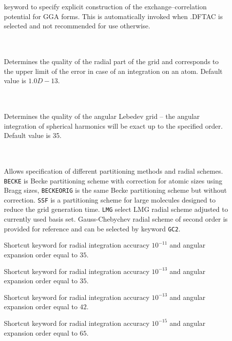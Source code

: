 \begin{description}
\item[]
  keyword to specify explicit construction of the exchange--correlation 
  potential for GGA forms. This is automatically invoked when .DFTAC is selected 
  and not recommended for use otherwise.

\item[] \ \\
   \\
  Determines the quality of the radial part of the grid and
  corresponds to the upper limit of the error in case of an
  integration on an atom. Default value is $1.0D-13$.

\item[] \ \\
   \\
  Determines the quality of the angular Lebedev grid -- the angular
  integration of spherical harmonics will be exact up to the specified
  order. Default value is 35.
\item[] \ \\
   \\
  Allows specification of different partitioning methods and radial
  schemes. \verb|BECKE| is Becke partitioning scheme with correction
  for atomic sizes using Bragg sizes, \verb|BECKEORIG| is the same
  Becke partitioning scheme but without correction. \verb|SSF| is a
  partitioning scheme for large molecules designed to reduce the grid
  generation time. \verb|LMG| select LMG radial scheme adjusted to
  currently used basis set. Gauss-Chebychev radial scheme of second
  order is provided for reference and can be selected by keyword
  \verb|GC2|.

\item[]
  Shortcut keyword for radial integration accuracy $10^{-11}$ and
  angular expansion order equal to $35$.
\item[]
  Shortcut keyword for radial integration accuracy $10^{-13}$ and
  angular expansion order equal to $35$.
\item[]
  Shortcut keyword for radial integration accuracy $10^{-13}$ and
  angular expansion order equal to $42$.
\item[]
  Shortcut keyword for radial integration accuracy $10^{-15}$ and
  angular expansion order equal to $65$.

\end{description}

